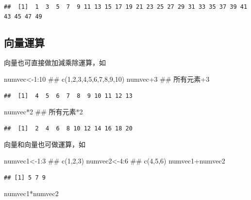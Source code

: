 \documentclass[]{book}
\newenvironment{Shaded}{\begin{snugshade}}{\end{snugshade}}
\newcommand{\DecValTok}[1]{\textcolor[rgb]{0.00,0.00,0.81}{{#1}}}
\newcommand{\NormalTok}[1]{{#1}}
\theoremstyle{definition}
\theoremstyle{definition}
\theoremstyle{remark}
\begin{document}
\begin{verbatim}
##  [1]  1  3  5  7  9 11 13 15 17 19 21 23 25 27 29 31 33 35 37 39 41 43 45 47 49
\end{verbatim}

\subsection{向量運算}

向量也可直接做加減乘除運算，如

\begin{Shaded}
\begin{Highlighting}[]
\NormalTok{numvec<-}\DecValTok{1}\NormalTok{:}\DecValTok{10} \NormalTok{## c(1,2,3,4,5,6,7,8,9,10)}
\NormalTok{numvec}\DecValTok{+3} \NormalTok{## 所有元素+3}
\end{Highlighting}
\end{Shaded}

\begin{verbatim}
##  [1]  4  5  6  7  8  9 10 11 12 13
\end{verbatim}

\begin{Shaded}
\begin{Highlighting}[]
\NormalTok{numvec*}\DecValTok{2} \NormalTok{## 所有元素*2}
\end{Highlighting}
\end{Shaded}

\begin{verbatim}
##  [1]  2  4  6  8 10 12 14 16 18 20
\end{verbatim}

向量和向量也可做運算，如

\begin{Shaded}
\begin{Highlighting}[]
\NormalTok{numvec1<-}\DecValTok{1}\NormalTok{:}\DecValTok{3} \NormalTok{## c(1,2,3)}
\NormalTok{numvec2<-}\DecValTok{4}\NormalTok{:}\DecValTok{6} \NormalTok{## c(4,5,6)}
\NormalTok{numvec1+numvec2}
\end{Highlighting}
\end{Shaded}

\begin{verbatim}
## [1] 5 7 9
\end{verbatim}

\begin{Shaded}
\begin{Highlighting}[]
\NormalTok{numvec1*numvec2}
\end{Highlighting}
\end{Shaded}
\end{document}

